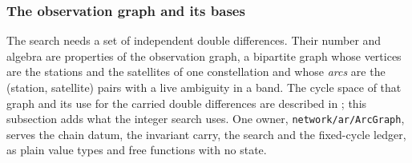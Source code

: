 \documentclass[main.tex]{subfiles}
\begin{document}
\subsubsection{The observation graph and its bases}\label{sec:ar-arcgraph}

The search needs a set of independent double differences.  Their number and
algebra are properties of the observation graph, a bipartite graph whose
vertices are the stations and the satellites of one constellation and whose
\emph{arcs} are the (station, satellite) pairs with a live ambiguity in a
band.  The cycle space of that graph and its use for the carried
double differences are described in
; this
subsection adds what the integer search uses.  One owner,
\texttt{network/ar/ArcGraph}, serves the chain datum, the invariant carry, the
search and the fixed-cycle ledger, as plain value types and free functions with
no state.
\end{document}
